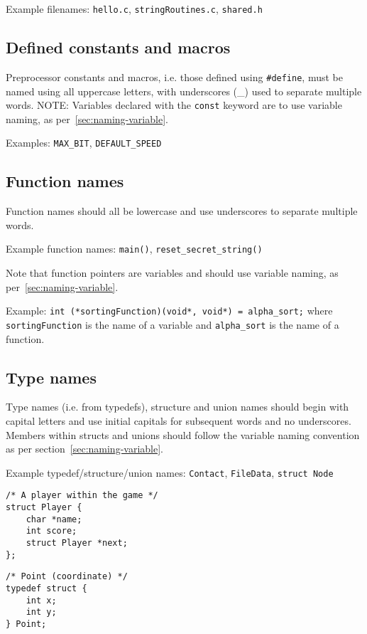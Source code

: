 \documentclass{article}
\begin{document}
Example filenames: \texttt{hello.c}, \texttt{stringRoutines.c}, \texttt{shared.h}

\subsection{Defined constants and macros}
\label{sec:naming-constants}
Preprocessor constants and macros, i.e. those defined using \texttt{\#define}, must be named 
using all uppercase letters, with underscores (\_) used to separate multiple words.
NOTE: Variables declared with the \texttt{const} keyword are to use variable naming, as 
per~\ref{sec:naming-variable}.

Examples: \texttt{MAX\_BIT}, \texttt{DEFAULT\_SPEED}

\subsection{Function names}
Function names should all be lowercase and use underscores to separate multiple words.

Example function names: \texttt{main()}, \texttt{reset\_secret\_string()}

Note that function pointers are variables and should use variable naming, as per~\ref{sec:naming-variable}.

Example: \texttt{int (*sortingFunction)(void*, void*) = alpha_sort;}\newline
where \texttt{sortingFunction} is the name of a variable and \texttt{alpha_sort} is the name of a function.

\subsection{Type names}
\label{sec:type-names}
Type names (i.e. from typedefs), structure and union names should begin with capital letters 
and use initial capitals for subsequent words and no underscores. Members within structs and unions should
follow the variable naming convention as per section~\ref{sec:naming-variable}.

Example typedef/structure/union names: \texttt{Contact}, \texttt{FileData}, \texttt{struct Node}

\begin{multicols}{2}
\begin{lstlisting}
/* A player within the game */
struct Player {
    char *name;
    int score;
    struct Player *next;
};
\end{lstlisting}
\vfill
\columnbreak

\begin{lstlisting}
/* Point (coordinate) */
typedef struct {
    int x;
    int y;
} Point;
\end{lstlisting}
\end{multicols}
\end{document}
